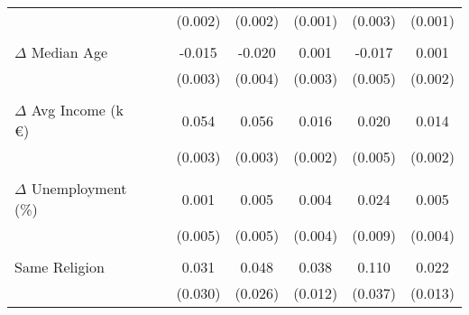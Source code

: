 {\begin{tabular}{l*{7}{c}}
            &                     &                     &     (0.002)         &     (0.002)         &     (0.001)         &     (0.003)         &     (0.001)         \\
            &                     &                     &                     &                     &                     &                     &                     \\
$\Delta$ Median Age&                     &                     &      -0.015\sym{***}&      -0.020\sym{***}&       0.001         &      -0.017\sym{***}&       0.001         \\
            &                     &                     &     (0.003)         &     (0.004)         &     (0.003)         &     (0.005)         &     (0.002)         \\
            &                     &                     &                     &                     &                     &                     &                     \\
$\Delta$ Avg Income (k \euro)&                     &                     &       0.054\sym{***}&       0.056\sym{***}&       0.016\sym{***}&       0.020\sym{***}&       0.014\sym{***}\\
            &                     &                     &     (0.003)         &     (0.003)         &     (0.002)         &     (0.005)         &     (0.002)         \\
            &                     &                     &                     &                     &                     &                     &                     \\
$\Delta$ Unemployment (\%)&                     &                     &       0.001         &       0.005         &       0.004         &       0.024\sym{**} &       0.005         \\
            &                     &                     &     (0.005)         &     (0.005)         &     (0.004)         &     (0.009)         &     (0.004)         \\
            &                     &                     &                     &                     &                     &                     &                     \\
Same Religion&                     &                     &       0.031         &       0.048\sym{*}  &       0.038\sym{***}&       0.110\sym{***}&       0.022\sym{*}  \\
            &                     &                     &     (0.030)         &     (0.026)         &     (0.012)         &     (0.037)         &     (0.013)         \\

\end{tabular}}
